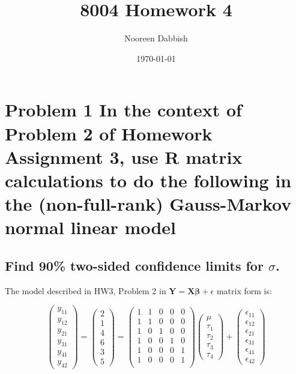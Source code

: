 \documentclass[11pt]{article}
\title{8004 Homework 4}
\author{Nooreen Dabbish}
\date{\today}
\begin{document}
\maketitle




\section{Problem 1 In the context of Problem 2 of Homework Assignment 3, use R matrix calculations to do the following in the (non-full-rank) Gauss-Markov normal linear model}
\label{sec-1}
\subsection{Find 90\% two-sided confidence limits for $\sigma$.}
\label{sec-1-1}


The model described in HW3, Problem 2 in 
$\mathbf{Y}=\mathbf{X\beta}+\epsilon$ matrix form is:

\[
\begin{pmatrix}
y_{11} \\ y_{12}\\ y_{21}\\ y_{31}\\ y_{41}\\ y_{42}
\end{pmatrix} = 
\begin{pmatrix} 
2\\ 1\\ 4\\ 6\\ 3\\ 5
\end{pmatrix} = 
\begin{pmatrix}
1 & 1 & 0 & 0 & 0 \\
1 & 1 & 0 & 0 & 0 \\
1 & 0 & 1 & 0 & 0 \\
1 & 0 & 0 & 1 & 0 \\
1 & 0 & 0 & 0 & 1 \\
1 & 0 & 0 & 0 & 1 \\
\end{pmatrix}  
\begin{pmatrix}
\mu \\ \tau_1 \\ \tau_2 \\ \tau_3 \\ \tau_4 
\end{pmatrix} + 
\begin{pmatrix}
\epsilon_{11} \\ \epsilon_{12}\\ \epsilon_{21}\\ \epsilon_{31}\\ \epsilon_{41}\\ \epsilon_{42}
\end{pmatrix}
\]
\end{document}
